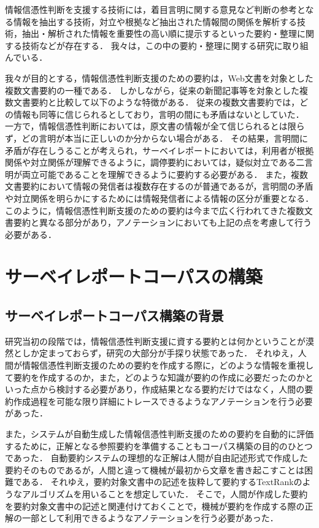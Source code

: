 \documentclass[japanese]{jnlp_1.4}
\begin{document}
情報信憑性判断を支援する技術には，着目言明に関する意見など判断の参考となる情報を抽出する技術，対立や根拠など抽出された情報間の関係を解析する技術，抽出・解析された情報を重要性の高い順に提示するといった要約・整理に関する技術などが存在する．
我々は，この中の要約・整理に関する研究に取り組んでいる．

我々が目的とする，情報信憑性判断支援のための要約は，Web文書を対象とした複数文書要約の一種である．
しかしながら，従来の新聞記事等を対象とした複数文書要約と比較して以下のような特徴がある．
従来の複数文書要約では，どの情報も同等に信じられるとしており，言明の間にも矛盾はないとしていた．
一方で，情報信憑性判断においては，原文書の情報が全て信じられるとは限らず，どの言明が本当に正しいのか分からない場合がある．
その結果，言明間に矛盾が存在しうることが考えられ，サーベイレポートにおいては，利用者が根拠関係や対立関係が理解できるように，調停要約においては，疑似対立である二言明が両立可能であることを理解できるように要約する必要がある．
また，複数文書要約において情報の発信者は複数存在するのが普通であるが，言明間の矛盾や対立関係を明らかにするためには情報発信者による情報の区分が重要となる．
このように，情報信憑性判断支援のための要約は今まで広く行われてきた複数文書要約と異なる部分があり，アノテーションにおいても上記の点を考慮して行う必要がある．


\section{サーベイレポートコーパスの構築}
\label{sc:survey_report}

\subsection{サーベイレポートコーパス構築の背景}
\label{ssc:survey_report_background}

研究当初の段階では，情報信憑性判断支援に資する要約とは何かということが漠然としか定まっておらず，研究の大部分が手探り状態であった．
それゆえ，人間が情報信憑性判断支援のための要約を作成する際に，どのような情報を重視して要約を作成するのか，また，どのような知識が要約の作成に必要だったのかといった点から検討する必要があり，作成結果となる要約だけではなく，人間の要約作成過程を可能な限り詳細にトレースできるようなアノテーションを行う必要があった．

また，システムが自動生成した情報信憑性判断支援のための要約を自動的に評価するために，正解となる参照要約を準備することもコーパス構築の目的のひとつであった．
自動要約システムの理想的な正解は人間が自由記述形式で作成した要約そのものであるが，人間と違って機械が最初から文章を書き起こすことは困難である．
それゆえ，要約対象文書中の記述を抜粋して要約するTextRankのようなアルゴリズムを用いることを想定していた．
そこで，人間が作成した要約を要約対象文書中の記述と関連付けておくことで，機械が要約を作成する際の正解の一部として利用できるようなアノテーションを行う必要があった．
\end{document}
